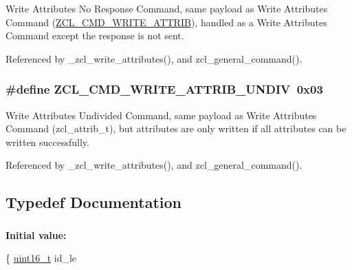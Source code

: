 Write Attributes No Response Command, same payload as Write Attributes Command (\hyperlink{group__zcl_ga8843c2bcb861c091ae6f9a4e36f7e4d8}{Z\-C\-L\-\_\-\-C\-M\-D\-\_\-\-W\-R\-I\-T\-E\-\_\-\-A\-T\-T\-R\-I\-B}), handled as a Write Attributes Command except the response is not sent. 



Referenced by \-\_\-zcl\-\_\-write\-\_\-attributes(), and zcl\-\_\-general\-\_\-command().

\hypertarget{group__zcl_ga9d67bef86e1ec74d60c06e1a09cfb86a}{
\subsubsection[{Z\-C\-L\-\_\-\-C\-M\-D\-\_\-\-W\-R\-I\-T\-E\-\_\-\-A\-T\-T\-R\-I\-B\-\_\-\-U\-N\-D\-I\-V}]{\setlength{\rightskip}{0pt plus 5cm}\#define Z\-C\-L\-\_\-\-C\-M\-D\-\_\-\-W\-R\-I\-T\-E\-\_\-\-A\-T\-T\-R\-I\-B\-\_\-\-U\-N\-D\-I\-V~0x03}}\label{group__zcl_ga9d67bef86e1ec74d60c06e1a09cfb86a}


Write Attributes Undivided Command, same payload as Write Attributes Command (zcl\-\_\-attrib\-\_\-t), but attributes are only written if all attributes can be written successfully. 



Referenced by \-\_\-zcl\-\_\-write\-\_\-attributes(), and zcl\-\_\-general\-\_\-command().



\subsection{Typedef Documentation}
\hypertarget{group__zcl_ga2373217b6694c1cb1a99113c24519a73}{
\subsubsection[{zcl\-\_\-attrib\-\_\-t}]{}}\label{group__zcl_ga2373217b6694c1cb1a99113c24519a73}
{\bfseries Initial value\-:}
\begin{DoxyCode}
\{
   \hyperlink{group__hal_ga5a8b2dc9e45a9ee81a94ef304fb62505}{uint16\_t}  id\_le
\end{DoxyCode}


